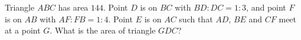 Triangle $ABC$ has area $144$. Point $D$ is on $BC$ with $BD:DC=1:3$, and point $F$ is on $AB$ with $AF:FB=1:4$. Point $E$ is on $AC$ such that $AD$, $BE$ and $CF$ meet at a point $G$. What is the area of triangle $GDC$?
